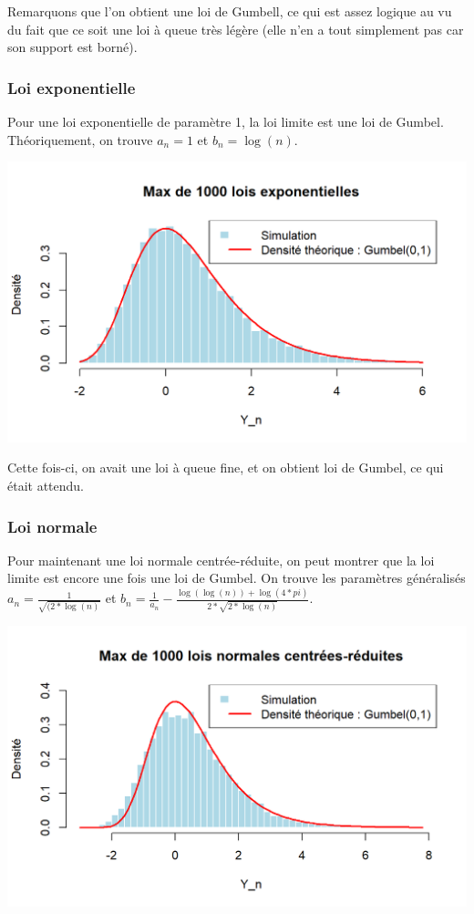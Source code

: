 \documentclass{article}
\begin{document}
\noindent Remarquons que l'on obtient une loi de Gumbell, ce qui est assez logique au vu du fait que ce soit une loi à queue très légère (elle n'en a tout simplement pas car son support est borné).

\subsubsection{Loi exponentielle}
\noindent Pour une loi exponentielle de paramètre 1, la loi limite est une loi de Gumbel. Théoriquement, on trouve $a_n = 1 $ et $b_n = \log(n) $.

\begin{center}
	\includegraphics[scale=0.8]{./images/Max_Expo.png} 
\end{center}

\noindent Cette fois-ci, on avait une loi à queue fine, et on obtient loi de Gumbel, ce qui était attendu.

\subsubsection{Loi normale}

\noindent Pour maintenant une loi normale centrée-réduite, on peut montrer que la loi limite est encore une fois une loi de Gumbel. On trouve les paramètres généralisés $a_n = \frac{1}{\sqrt{(2*\log(n)}} $ et $b_n = \frac{1}{a_n} - \frac{\log(\log(n)) + \log(4 * pi)}{2 * \sqrt{2 * \log(n)}} $.

\begin{center}
	\includegraphics[scale=0.8]{./images/Max_Normale.png} 
\end{center}
\end{document}
